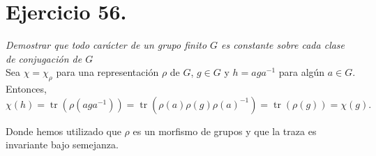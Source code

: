 \section{Ejercicio 56.}%
\label{sec:ejercicio_56_}

\textit{Demostrar que todo carácter de un grupo finito \(G\) es constante sobre cada clase de conjugación de  \(G\)}\\

Sea \(\chi = \chi_{\rho}\) para una representación \(\rho\) de \(G\), \(g \in G\) y \(h = aga^{-1}\) para algún \(a \in G\). Entonces,
\[
\chi(h) = \operatorname{tr} (\rho(aga^{-1})) = \operatorname{tr} (\rho(a)\rho(g)\rho(a)^{-1}) = \operatorname{tr}(\rho(g)) = \chi(g)
.\]

Donde hemos utilizado que \(\rho\) es un morfismo de grupos y que la traza es invariante bajo semejanza.
